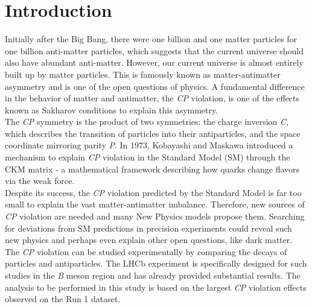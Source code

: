 \chapter{Introduction}

Initially after the Big Bang, there were one billion and one matter particles for one billion anti-matter particles, which suggests that the current universe should also have abundant anti-matter. However, our current universe is almost entirely built up by matter particles. This is famously known as matter-antimatter asymmetry and is one of the open questions of physics.  A fundamental
difference in the behavior of matter and antimatter, the \textit{CP} violation, is one of the effects
known as Sakharov conditions to explain this asymmetry.\\

The \textit{CP} symmetry is the product of two symmetries: the charge inversion \textit{C}, which
describes the transition of particles into their antiparticles, and the space coordinate
mirroring parity \textit{P}. In 1973, Kobayashi and Maskawa introduced a mechanism to explain \textit{CP} violation in the Standard Model (SM) through the CKM matrix - a mathematical framework describing how quarks change flavors via the weak force.\\

Despite its success, the \textit{CP} violation predicted by the Standard Model is far too small to explain the vast matter-antimatter imbalance. Therefore, new sources of \textit{CP} violation are needed and many New Physics models propose them. Searching for deviations from SM predictions in precision experiments could reveal such new physics and perhaps even explain other open questions, like dark matter.\\

The \textit{CP} violation can be studied experimentally by comparing the decays of particles
and antiparticles. The LHCb experiment is specifically designed for such studies in the
\textit{B} meson region and has already provided substantial results. The analysis to be performed in this study is based on the largest \textit{CP} violation effects
observed on the Run 1 dataset.\\

